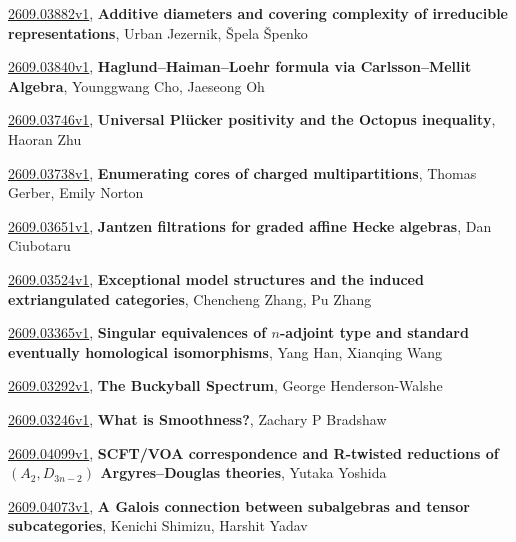 \documentclass[9pt, a4paper]{article}
\theoremstyle{plain}
\theoremstyle{definition}
\theoremstyle{remark}
\newcommand{\arxiv}[3]{\href{https://arxiv.org/abs/#1}{#1}, \textbf{\textcolor{arxivblue}{#2}}, #3}
\begin{document}
\arxiv{2609.03882v1}{Additive diameters and covering complexity of irreducible representations}{Urban Jezernik, Špela Špenko}

\arxiv{2609.03840v1}{Haglund--Haiman--Loehr formula via Carlsson--Mellit Algebra}{Younggwang Cho, Jaeseong Oh}

\arxiv{2609.03746v1}{Universal Plücker positivity and the Octopus inequality}{Haoran Zhu}

\arxiv{2609.03738v1}{Enumerating cores of charged multipartitions}{Thomas Gerber, Emily Norton}

\arxiv{2609.03651v1}{Jantzen filtrations for graded affine Hecke algebras}{Dan Ciubotaru}

\arxiv{2609.03524v1}{Exceptional model structures and the induced extriangulated categories}{Chencheng Zhang, Pu Zhang}

\arxiv{2609.03365v1}{Singular equivalences of $n$-adjoint type and standard eventually homological isomorphisms}{Yang Han, Xianqing Wang}

\arxiv{2609.03292v1}{The Buckyball Spectrum}{George Henderson-Walshe}

\arxiv{2609.03246v1}{What is Smoothness?}{Zachary P Bradshaw}

\arxiv{2609.04099v1}{SCFT/VOA correspondence and R-twisted reductions of $(A_2,D_{3n-2})$ Argyres--Douglas theories}{Yutaka Yoshida}

\arxiv{2609.04073v1}{A Galois connection between subalgebras and tensor subcategories}{Kenichi Shimizu, Harshit Yadav}

\end{document}
